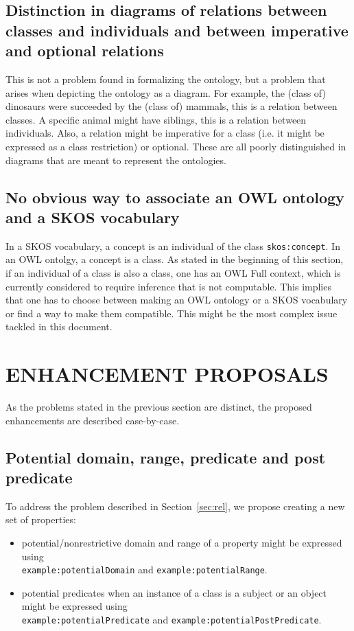 \documentclass[12pt,fleqn]{article}
\begin{document}
\subsection{Distinction in diagrams of relations between classes and individuals and between imperative and optional relations}\label{sec:dia}
This is not a problem found in formalizing the ontology,
but a problem that arises when depicting the ontology as a diagram.
For example, the (class of) dinosaurs were succeeded by the (class of) mammals,
this is a relation between classes.
A specific animal might have siblings, this is a relation between individuals.
Also, a relation might be imperative for a class (i.e. it might be expressed as a class restriction)
or optional.
These are all poorly distinguished in diagrams that are meant to represent the ontologies.

\subsection{No obvious way to associate an OWL ontology and a SKOS vocabulary}
In a SKOS vocabulary, a concept is an individual of the class \texttt{skos:concept}.
In an OWL ontolgy, a concept is a class.
As stated in the beginning of this section, 
if an individual of a class is also a class,
one has an OWL Full context, which is
currently considered to require inference that is not computable.
This implies that one has to choose between making
an OWL ontology or a SKOS vocabulary or find a way to
make them compatible.
This might be the most complex issue tackled in this document.

\section{ENHANCEMENT PROPOSALS}\label{sec:prop}
As the problems stated in the previous section are distinct,
the proposed enhancements are described case-by-case.

\subsection{Potential domain, range, predicate and post predicate}
To address the problem described in Section~\ref{sec:rel},
we propose creating a new set of properties:
\begin{itemize}
	\item potential/nonrestrictive domain and range of a property might be expressed using\\
		\texttt{example:potentialDomain} and \texttt{example:potentialRange}.
	\item potential predicates when an instance of a class is a subject or an object might
		be expressed using\\
		\texttt{example:potentialPredicate} and \texttt{example:potentialPostPredicate}.
\end{itemize}
\end{document}
